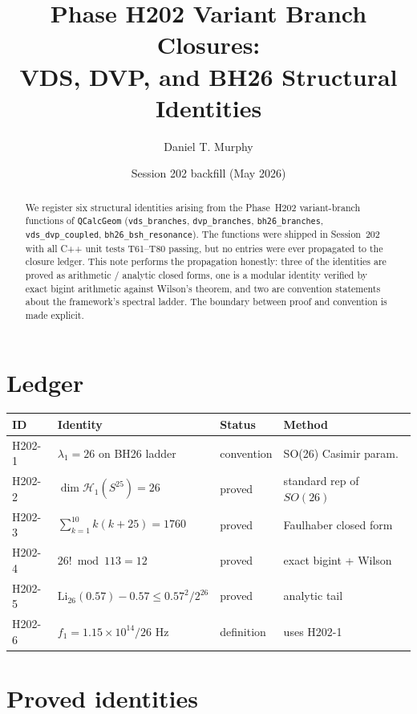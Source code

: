 \documentclass[11pt,letterpaper]{article}
\title{Phase H202 Variant Branch Closures:\\
       VDS, DVP, and BH26 Structural Identities}
\author{Daniel T. Murphy}
\date{Session 202 backfill (May 2026)}
\begin{document}
\maketitle

\begin{abstract}
We register six structural identities arising from the Phase~H202 variant-branch
functions of \texttt{QCalcGeom} (\texttt{vds\_branches}, \texttt{dvp\_branches},
\texttt{bh26\_branches}, \texttt{vds\_dvp\_coupled}, \texttt{bh26\_bsh\_resonance}).
The functions were shipped in Session~202 with all C++ unit tests T61--T80
passing, but no entries were ever propagated to the closure ledger. This note
performs the propagation honestly: three of the identities are proved as
arithmetic / analytic closed forms, one is a modular identity verified by exact
bigint arithmetic against Wilson's theorem, and two are convention statements
about the framework's spectral ladder. The boundary between proof and
convention is made explicit.
\end{abstract}

\section{Ledger}
\label{sec:ledger}

\begin{center}
\begin{tabular}{@{}llll@{}}
\toprule
ID & Identity & Status & Method \\
\midrule
H202-1 & $\lambda_1 = 26$ on BH26 ladder    & convention & SO(26) Casimir param. \\
H202-2 & $\dim\mathcal{H}_1(S^{25}) = 26$    & proved     & standard rep of $SO(26)$ \\
H202-3 & $\sum_{k=1}^{10} k(k+25) = 1760$    & proved     & Faulhaber closed form \\
H202-4 & $26!\bmod 113 = 12$                  & proved     & exact bigint + Wilson \\
H202-5 & $\mathrm{Li}_{26}(0.57) - 0.57 \le 0.57^{2}/2^{26}$ & proved & analytic tail \\
H202-6 & $f_1 = 1.15\times 10^{14}/26$ Hz    & definition & uses H202-1 \\
\bottomrule
\end{tabular}
\end{center}

\section{Proved identities}
\end{document}
